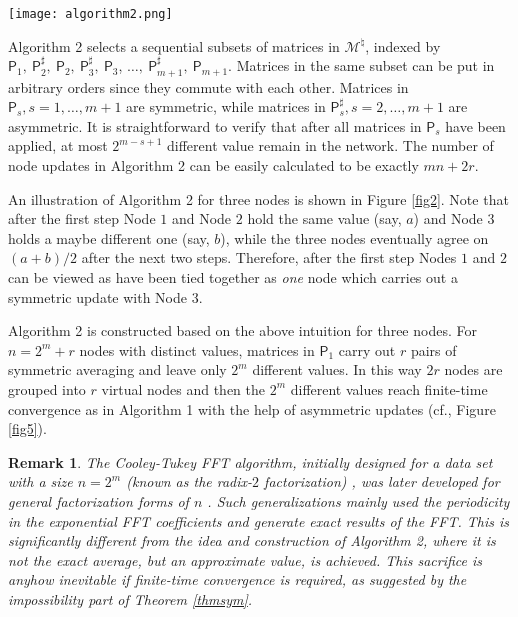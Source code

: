 \documentclass[a4paper, 11pt]{article}
\newtheorem{remark}{Remark}
\begin{document}
\begin{figure*}[t]
\begin{center}
\texttt{[image: algorithm2.png]}
\caption{{An illustration of Algorithm 2 for $n=2^m+r$ nodes. Divide the $2^m$ nodes into two subgroups with $2^{m-1}$ nodes in each of the group. Tie the rest of $r$ nodes pairwise with another $r$ nodes in one of the group. Then apply the above three-node arrangement to the pair of nodes with another node selected from the remaining group so that Algorithm 1 can be repeated.  Finite-time convergence is therefore achieved and it turns out this is the fastest algorithm in terms of number of node updates.}   } \label{fig5}
\end{center}
\end{figure*}


Algorithm 2 selects a sequential subsets of matrices in $\mathscr{M}^\natural$, indexed by $\mathsf{P}_1,\ \mathsf{P}_2^\sharp,\ \mathsf{P}_2,\ \mathsf{P}_3^\sharp, \ \mathsf{P}_3$, $\dots, \ \mathsf{P}_{m+1}^\sharp,\ \mathsf{P}_{m+1}$.  Matrices in the same subset can be put in arbitrary orders since they commute with each other. Matrices in $\mathsf{P}_s,s=1,\dots,m+1$ are symmetric, while matrices in $\mathsf{P}_s^\sharp,s=2,\dots,m+1$ are asymmetric. It is straightforward  to verify that after all matrices in $\mathsf{P}_s$ have been applied,   at most $2^{m-s+1}$ different value  remain  in the network. The number of node updates in Algorithm 2 can be easily calculated to be exactly $mn+2r$.

An illustration of Algorithm 2 for three nodes is shown in Figure \ref{fig2}. Note that after the first step  Node $1$ and Node $2$ hold the same value (say, $a$) and Node $3$ holds a maybe different one (say, $b$),  while the three nodes eventually agree on $({a}+{b})/{2}$ after the next  two steps. Therefore, after the first step Nodes $1$ and $2$ can be viewed as have been tied together as {\it one} node  which carries out a symmetric update with Node $3$.

Algorithm 2 is constructed based on the above intuition for three nodes. For $n=2^m+r$ nodes with distinct values, matrices in $\mathsf{P}_1$ carry out $r$ pairs of symmetric averaging and leave only $2^m$ different values. In this way $2r$ nodes are grouped into $r$ virtual nodes and then the $2^m$ different values reach finite-time convergence as in Algorithm 1 with the help of asymmetric updates (cf., Figure \ref{fig5}).

{
\begin{remark}
The  Cooley-Tukey  FFT algorithm, initially designed for a data set with a size $n=2^m$ (known as the radix-$2$ factorization) \cite{butterfly}, was later developed for general factorization forms of $n$ \cite{IDFT,FFTbook}. Such generalizations mainly used the periodicity in the exponential FFT coefficients  and generate  exact results of the FFT. This is significantly different from the idea and construction of  Algorithm 2, where it is not the exact average, but an approximate value,  is achieved. This sacrifice is anyhow inevitable if finite-time convergence is required, as suggested by the impossibility part of Theorem \ref{thmsym}.
\end{remark}
}
\end{document}
